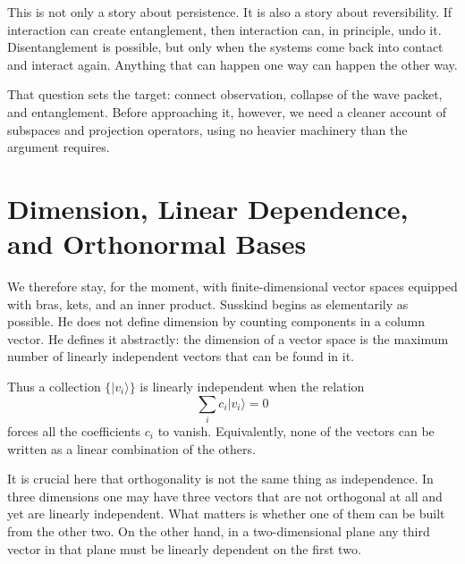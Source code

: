This is not only a story about persistence. It is also a story about reversibility. If interaction can create entanglement, then interaction can, in principle, undo it. Disentanglement is possible, but only when the systems come back into contact and interact again. Anything that can happen one way can happen the other way.

\begin{classroomqa}
\end{classroomqa}

That question sets the target: connect observation, collapse of the wave packet, and entanglement. Before approaching it, however, we need a cleaner account of subspaces and projection operators, using no heavier machinery than the argument requires.

\section{Dimension, Linear Dependence, and Orthonormal Bases}

We therefore stay, for the moment, with finite-dimensional vector spaces equipped with bras, kets, and an inner product. Susskind begins as elementarily as possible. He does not define dimension by counting components in a column vector. He defines it abstractly: the dimension of a vector space is the maximum number of linearly independent vectors that can be found in it.

Thus a collection \(\{|v_i\rangle\}\) is linearly independent when the relation
\begin{equation}
\sum_i c_i |v_i\rangle = 0
\end{equation}
forces all the coefficients \(c_i\) to vanish. Equivalently, none of the vectors can be written as a linear combination of the others.

It is crucial here that orthogonality is not the same thing as independence. In three dimensions one may have three vectors that are not orthogonal at all and yet are linearly independent. What matters is whether one of them can be built from the other two. On the other hand, in a two-dimensional plane any third vector in that plane must be linearly dependent on the first two.


